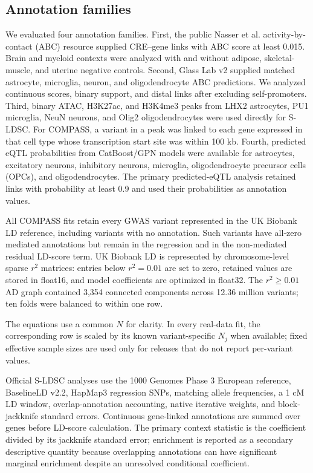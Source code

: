 \documentclass[11pt]{article}
\begin{document}
\subsection{Annotation families}

We evaluated four annotation families. First, the public Nasser et al. activity-by-contact (ABC) resource supplied CRE--gene links with ABC score at least 0.015. Brain and myeloid contexts were analyzed with and without adipose, skeletal-muscle, and uterine negative controls. Second, Glass Lab v2 supplied matched astrocyte, microglia, neuron, and oligodendrocyte ABC predictions. We analyzed continuous scores, binary support, and distal links after excluding self-promoters. Third, binary ATAC, H3K27ac, and H3K4me3 peaks from LHX2 astrocytes, PU1 microglia, NeuN neurons, and Olig2 oligodendrocytes were used directly for S-LDSC. For COMPASS, a variant in a peak was linked to each gene expressed in that cell type whose transcription start site was within 100 kb. Fourth, predicted eQTL probabilities from CatBoost/GPN models were available for astrocytes, excitatory neurons, inhibitory neurons, microglia, oligodendrocyte precursor cells (OPCs), and oligodendrocytes. The primary predicted-eQTL analysis retained links with probability at least 0.9 and used their probabilities as annotation values.

All COMPASS fits retain every GWAS variant represented in the UK Biobank LD reference, including variants with no annotation. Such variants have all-zero mediated annotations but remain in the regression and in the non-mediated residual LD-score term. UK Biobank LD is represented by chromosome-level sparse $r^2$ matrices: entries below $r^2=0.01$ are set to zero, retained values are stored in float16, and model coefficients are optimized in float32. The $r^2\ge0.01$ AD graph contained 3,354 connected components across 12.36 million variants; ten folds were balanced to within one row.

The equations use a common $N$ for clarity. In every real-data fit, the corresponding row is scaled by its known variant-specific $N_j$ when available; fixed effective sample sizes are used only for releases that do not report per-variant values.

Official S-LDSC analyses use the 1000 Genomes Phase 3 European reference, BaselineLD v2.2, HapMap3 regression SNPs, matching allele frequencies, a 1 cM LD window, overlap-annotation accounting, native iterative weights, and block-jackknife standard errors. Continuous gene-linked annotations are summed over genes before LD-score calculation. The primary context statistic is the coefficient divided by its jackknife standard error; enrichment is reported as a secondary descriptive quantity because overlapping annotations can have significant marginal enrichment despite an unresolved conditional coefficient.
\end{document}
